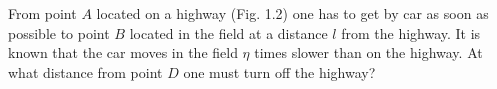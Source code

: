 
\item From point \( A \) located on a highway (Fig. 1.2) one has to get by car as soon as possible to point \( B \) located in the field at a distance \( l \) from the highway. It is known that the car moves in the field \( \eta \) times slower than on the highway. At what distance from point \( D \) one must turn off the highway?
    \begin{center}
    \end{center}
